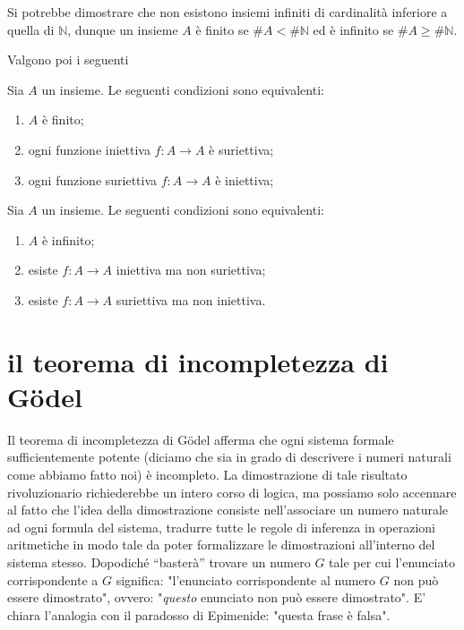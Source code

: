 \documentclass[italian,a4paper,hidelinks,headinclude]{scrartcl}
\newcommand{\NN}{{\mathbb N}}
\begin{document}
Si potrebbe dimostrare che non esistono insiemi infiniti di cardinalità
inferiore a quella di $\NN$, dunque un insieme $A$ è finito se $\# A < \#\NN$
ed è infinito se $\# A \ge \# \NN$.

Valgono poi i seguenti
\begin{theorem}
Sia $A$ un insieme. Le seguenti condizioni sono equivalenti:
\begin{enumerate}
\item $A$ è finito;
\item ogni funzione iniettiva $f\colon A \to A$ è suriettiva;
\item ogni funzione suriettiva $f\colon A \to A$ è iniettiva;
\end{enumerate}
\end{theorem}

\begin{theorem}
Sia $A$ un insieme. Le seguenti condizioni sono equivalenti:
\begin{enumerate}
\item $A$ è infinito;
\item esiste $f\colon A\to A$ iniettiva ma non suriettiva;
\item esiste $f\colon A\to A$ suriettiva ma non iniettiva.
\end{enumerate}
\end{theorem}

\section{il teorema di incompletezza di G\"odel}

Il teorema di incompletezza di G\"odel afferma che ogni
sistema formale sufficientemente potente (diciamo che sia in grado di
descrivere i numeri naturali come abbiamo fatto noi) è incompleto.
La dimostrazione di tale risultato rivoluzionario richiederebbe un intero
corso di logica, ma possiamo solo accennare al fatto che l'idea della
dimostrazione consiste nell'associare un numero naturale ad ogni formula
del sistema, tradurre tutte le regole di inferenza in operazioni aritmetiche
in modo tale da poter formalizzare le dimostrazioni all'interno del sistema
stesso. Dopodiché ``basterà'' trovare un numero $G$ tale per cui
l'enunciato corrispondente a $G$ significa:
"l'enunciato corrispondente al numero $G$ non può essere dimostrato",
ovvero: "\emph{questo} enunciato non può essere dimostrato".
E' chiara l'analogia con il paradosso di Epimenide: "questa frase è falsa".
\end{document}

